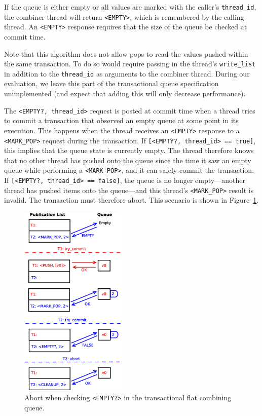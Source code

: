 If the queue is either empty or all values are marked with the caller's \texttt{thread\_id}, the combiner thread will return \texttt{<EMPTY>}, which is remembered by the calling thread. An \texttt{<EMPTY>} response requires that the size of the queue be checked at commit time.

Note that this algorithm does not allow pops to read the values pushed within the same transaction. To do so would require passing in the thread's \texttt{write\_list} in addition to the \texttt{thread\_id} as arguments to the combiner thread. During our evaluation, we leave this part of the transactional queue specification unimplemented (and expect that adding this will only decrease performance).

The \texttt{<EMPTY?, thread\_id>} request is posted at commit time when a thread tries to commit a transaction that observed an empty queue at some point in its execution. This happens when the thread receives an \texttt{<EMPTY>} response to a \texttt{<MARK\_POP>} request during the transaction. If \texttt{[<EMPTY?, thread\_id> == true]}, this implies that the queue state is currently empty.
The thread therefore knows that no other thread has pushed onto the queue since the time it saw an empty queue while performing a \texttt{<MARK\_POP>}, and it can safely commit the transaction. If \texttt{[<EMPTY?, thread\_id> == false]}, the queue is no longer empty---another thread has pushed items onto the queue---and this thread's \texttt{<MARK\_POP>} result is invalid. The transaction must therefore abort. This scenario is shown in Figure~\ref{fig:fcqueue_abort2}.

\begin{figure}[t]
\centering
\includegraphics[width=0.45\textwidth]{fcqueue_abort2}
    \caption{Abort when checking \texttt{<EMPTY?>} in the transactional flat combining queue.}
\label{fig:fcqueue_abort2}
\end{figure}

